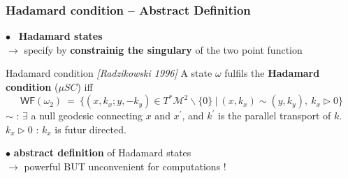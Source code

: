 \documentclass[9pt]{beamer}
\newcommand{\WF}{\mathsf{WF}} %
\newcommand{\citebeam}[1]{\textit{\textcolor{black!60!white}{[#1]}}} %
\newcommand{\Mcal}{\mathcal{M}}
\begin{document}
\begin{frame}

\frametitle{Hadamard condition -- Abstract Definition}

\vfill

$\bullet$ \ \textbf{Hadamard states} \\ 
\qquad $\to$ specify by \textbf{constrainig the singulary} of the two point function

\vfill

\begin{block}{Hadamard condition \citebeam{Radzikowski 1996}}
A state $\omega$ fulfils the \textbf{Hadamard condition} ($\mu S C$) iff
\begin{equation*}
 \WF(\omega_{2}) \ = \ \bigg\{ (x,k_x ; y,-k_y) \in T^\ast\Mcal^2 \backslash \{0\} \ \bigg| \ (x,k_x) \sim (y,k_y) , \ k_x \triangleright 0 \bigg\}
\end{equation*}
$\sim$ : $\exists$ a null geodesic connecting $x$ and $x^\prime$, and $k^\prime$ is the parallel transport of $k$. \\
$k_x \triangleright 0$ : $k_x$ is futur directed.
\end{block}

\vfill

$\bullet$ \textbf{abstract definition} of Hadamard states \\
\qquad $\to$ powerful BUT unconvenient for computations !

\vfill

\end{frame} 

\end{document}
